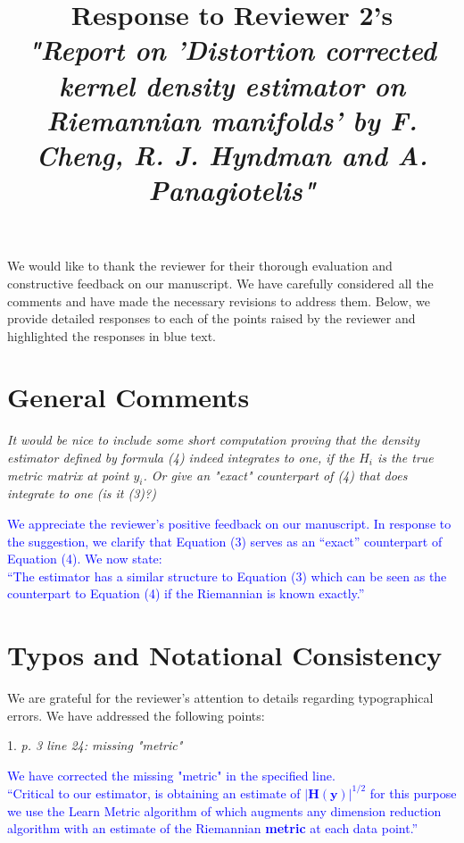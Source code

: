 \documentclass{article}
\date{\vspace{-8ex}}
\begin{document}
\title{Response to Reviewer 2's \\ \textit{"Report on 'Distortion corrected kernel density estimator on Riemannian manifolds' by F. Cheng, R. J. Hyndman and A. Panagiotelis"} }

\maketitle

We would like to thank the reviewer for their thorough evaluation and constructive feedback on our manuscript. We have carefully considered all the comments and have made the necessary revisions to address them. Below, we provide detailed responses to each of the points raised by the reviewer and highlighted the responses in blue text.

\section*{General Comments}

\textit{It would be nice to include some short computation proving that the density estimator defined by formula (4) indeed integrates to one, if the \(H_{i}\) is the true metric matrix at point \(y_{i}\). Or give an "exact" counterpart of (4) that does integrate to one (is it (3)?)}

\textcolor{blue}{We appreciate the reviewer's positive feedback on our manuscript. In response to the suggestion, we clarify that Equation (3) serves as an ``exact'' counterpart of Equation (4). We now state:\\
	``The estimator has a similar structure to Equation (3) which can be seen as the counterpart to Equation (4) if the Riemannian is known exactly.''
}

\section*{Typos and Notational Consistency}

We are grateful for the reviewer's attention to details regarding typographical errors. We have addressed the following points:

1. \textit{p. 3 line 24: missing "metric"}

   \textcolor{blue}{%
   We have corrected the missing "metric" in the specified line. \\
   ``Critical to our estimator, is obtaining an estimate of $|\bm{H}(\bm{y})|^{1/2}$ for this purpose we use the Learn Metric algorithm of \textcite{Perrault-Joncas2013-pq} which augments any dimension reduction algorithm with an estimate of the Riemannian \textbf{metric} at each data point.''
   }
\end{document}
